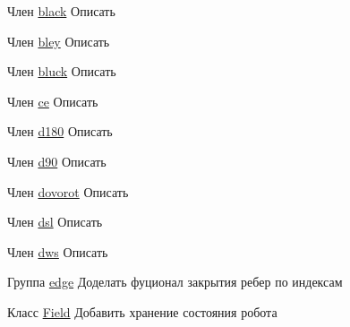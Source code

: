 
\begin{DoxyRefList}
\item[Член \mbox{\hyperlink{constants_8h_a526b84ff467bb3f48d4092d207e20041}{black}} ]\label{todo__todo000004}%
%
Описать  
\item[Член \mbox{\hyperlink{constants_8h_ab8cc5631fe0afbf3f89928614526e3ab}{bley}} ]\label{todo__todo000006}%
%
Описать  
\item[Член \mbox{\hyperlink{constants_8h_ada52bf37d99d21d44b3829001c6c5375}{bluck}} ]\label{todo__todo000005}%
%
Описать  
\item[Член \mbox{\hyperlink{constants_8h_a0095000eaa5f4e875bdfb2e237512b49}{ce}} ]\label{todo__todo000002}%
%
Описать  
\item[Член \mbox{\hyperlink{constants_8h_a89ade2428383357f898ca77d9e519233}{d180}} ]\label{todo__todo000012}%
%
Описать  
\item[Член \mbox{\hyperlink{constants_8h_a3a11c1451b3273f2ce1e1aac96cf1a72}{d90}} ]\label{todo__todo000011}%
%
Описать  
\item[Член \mbox{\hyperlink{constants_8h_a48357e8357805096f5bdf44061dade23}{dovorot}} ]\label{todo__todo000013}%
%
Описать  
\item[Член \mbox{\hyperlink{constants_8h_aaedbe9dfdd2911d31f58ecc87faabd1b}{dsl}} ]\label{todo__todo000010}%
%
Описать  
\item[Член \mbox{\hyperlink{constants_8h_aef590841a51a3b1a396375179ca1c68c}{dws}} ]\label{todo__todo000009}%
%
Описать  
\item[Группа \mbox{\hyperlink{group__edge}{edge}} ]\label{todo__todo000018}%
%
Доделать фуционал закрытия ребер по индексам  
\item[Класс \mbox{\hyperlink{struct_field}{Field}} ]\label{todo__todo000019}%
%
Добавить хранение состояния робота 


\end{DoxyRefList}
